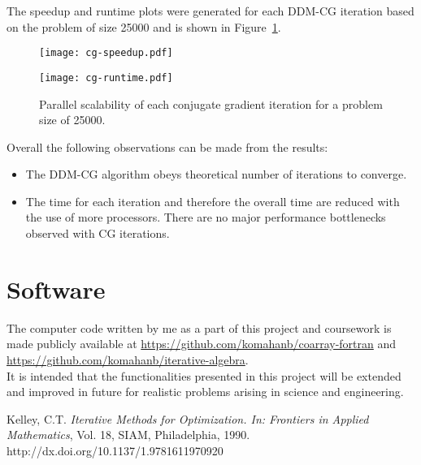 \documentclass[12pt]{report}
\begin{document}
The speedup and runtime plots were generated for each DDM-CG iteration
based on the problem of size 25000 and is shown in Figure~\ref{fig:cg}.
\begin{figure}[H]
  \centering
  \begin{minipage}{0.45\linewidth}
    \texttt{[image: cg-speedup.pdf]}
    \label{Speedup}
  \end{minipage}
  \begin{minipage}{0.45\linewidth}
    \texttt{[image: cg-runtime.pdf]}
    \label{Runtime}
  \end{minipage}
  \caption{Parallel scalability of each conjugate gradient iteration
    for a problem size of 25000. }
  \label{fig:cg}
\end{figure}

Overall the following observations can be made from the results:
\begin{itemize}
\item The DDM-CG algorithm obeys theoretical number of iterations to converge.
\item The time for each iteration and therefore the overall time are
  reduced with the use of more processors. There are no major
  performance bottlenecks observed with CG iterations.
\end{itemize}

\section{Software}
The computer code written by me as a part of this project and
coursework is made publicly available at \newline
\href{https://github.com/komahanb/coarray-fortran}{https://github.com/komahanb/coarray-fortran}
and
\href{https://github.com/komahanb/}{https://github.com/komahanb/iterative-algebra}.
\\
It is intended that the functionalities presented in this project
will be extended and improved in future for realistic problems arising
in science and engineering.

\begin{thebibliography}{9}
  
 Kelley, C.T. \emph{Iterative Methods for
  Optimization. In: Frontiers in Applied Mathematics}, Vol. 18, SIAM,
  Philadelphia, 1990.  http://dx.doi.org/10.1137/1.9781611970920
\end{thebibliography}
\end{document}

